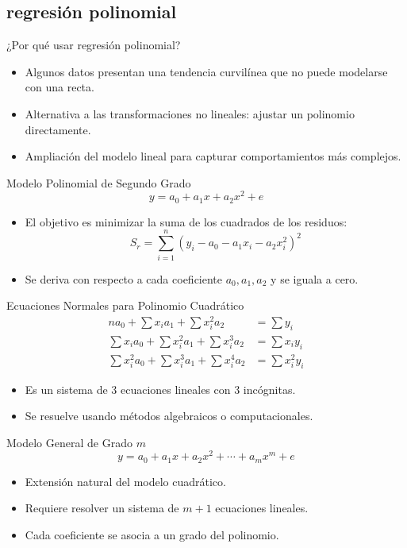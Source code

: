 \documentclass[main.tex]{subfiles}
\begin{document}
\subsection{regresión polinomial}
\begin{frame}{¿Por qué usar regresión polinomial?}
  \begin{itemize}
    \item Algunos datos presentan una tendencia curvilínea que no puede modelarse con una recta.
    \item Alternativa a las transformaciones no lineales: ajustar un polinomio directamente.
    \item Ampliación del modelo lineal para capturar comportamientos más complejos.
  \end{itemize}
\end{frame}

\begin{frame}{Modelo Polinomial de Segundo Grado}
  \[
    y = a_0 + a_1 x + a_2 x^2 + e
  \]
  \begin{itemize}
    \item El objetivo es minimizar la suma de los cuadrados de los residuos:
    \[
      S_r = \sum_{i=1}^{n} (y_i - a_0 - a_1 x_i - a_2 x_i^2)^2
    \]
    \item Se deriva con respecto a cada coeficiente \(a_0, a_1, a_2\) y se iguala a cero.
  \end{itemize}
\end{frame}

\begin{frame}{Ecuaciones Normales para Polinomio Cuadrático}
  \small
  \[
  \begin{aligned}
    n a_0 + \sum x_i a_1 + \sum x_i^2 a_2 &= \sum y_i \\
    \sum x_i a_0 + \sum x_i^2 a_1 + \sum x_i^3 a_2 &= \sum x_i y_i \\
    \sum x_i^2 a_0 + \sum x_i^3 a_1 + \sum x_i^4 a_2 &= \sum x_i^2 y_i
  \end{aligned}
  \]
  \begin{itemize}
    \item Es un sistema de 3 ecuaciones lineales con 3 incógnitas.
    \item Se resuelve usando métodos algebraicos o computacionales.
  \end{itemize}
\end{frame}

\begin{frame}{Modelo General de Grado \(m\)}
  \[
    y = a_0 + a_1 x + a_2 x^2 + \cdots + a_m x^m + e
  \]
  \begin{itemize}
    \item Extensión natural del modelo cuadrático.
    \item Requiere resolver un sistema de \(m + 1\) ecuaciones lineales.
    \item Cada coeficiente se asocia a un grado del polinomio.
  \end{itemize}
\end{frame}
\end{document}
